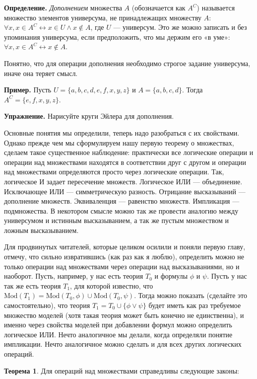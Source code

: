 {\bfseries Определение.} {\slshape Дополнением} множества $A$ (обозначается как $A^C$) называется множество элементов универсума, не принадлежащих множеству $A$: $\forall x, x\in A^C \leftrightarrow x\in U \wedge x \not \in A$, где $U$ — универсум. Это же можно записать и без упоминания универсума, если предположить, что мы держим его «в уме»: $\forall x, x\in A^C \leftrightarrow x\not \in A$.

Понятно, что для операции дополнения необходимо строгое задание универсума, иначе она теряет смысл.

{\bfseries Пример.} Пусть $U = \{a, b, c, d, e, f, x, y, z\}$ и $A = \{a, b, c, d\}$. Тогда $A^C = \{e, f, x, y, z\}$.

{\bfseries Упражнение.} Нарисуйте круги Эйлера для дополнения.

Основные понятия мы определили, теперь надо разобраться с их свойствами. Однако прежде чем мы сформулируем нашу первую теорему о множествах, сделаем такое существенное наблюдение: практически все логические операции и операции над множествами находятся в соответствии друг с другом и операции над множествами определяются просто через логические операции. Так, логическое И задает пересечение множеств. Логическое ИЛИ — объединение. Исключающее ИЛИ — симметрическую разность. Отрицание высказываний — дополнение множеств. Эквиваленция — равенство множеств. Импликация — подмножества. В некотором смысле можно так же провести аналогию между универсумом и истинным высказыванием, а так же пустым множеством и ложным высказыванием.

Для продвинутых читателей, которые целиком осилили и поняли первую главу, отмечу, что сильно извратившись (как раз как я люблю), определить можно не только операции над множествами через операции над высказываниями, но и наоборот. Пусть, например, у нас есть теория $T_0$ и формулы $\phi$ и $\psi$. Пусть у нас так же есть теория $T_1$, для которой известно, что $\mathrm{Mod}(T_1) = \mathrm{Mod}(T_0, \phi) \cup \mathrm{Mod}(T_0, \psi)$. Тогда можно показать (сделайте это самостоятельно), что теория $T_1 = T_0 \cup \{\phi\vee \psi\}$ будет иметь как раз требуемое множество моделей (хотя такая теория может быть конечно не единственна), и именно через свойства моделей при добавлении формул можно определить логическое ИЛИ. Нечто аналогичное мы делали, когда определяли понятие импликации. Нечто аналогичное можно сделать и для всех других логических операций.

{\bfseries Теорема 1}. Для операций над множествами справедливы следующие законы:

